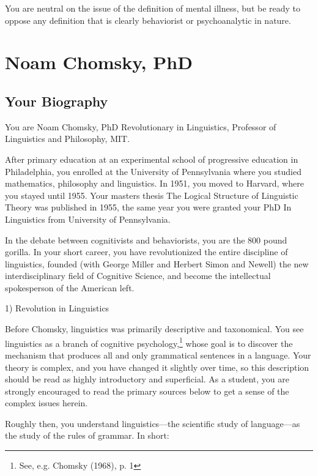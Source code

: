 \begin{refsection}
You are neutral on the issue of the definition of mental illness, but be ready to oppose any definition that is clearly behaviorist or psychoanalytic in nature.

\chapter{Noam Chomsky, PhD}
\label{noamchomskyphd}

\section{Your Biography}
\label{yourbiography}

You are Noam Chomsky, PhD Revolutionary in Linguistics, Professor of Linguistics and Philosophy, MIT.

After primary education at an experimental school of progressive education in Philadelphia, you enrolled at the University of Pennsylvania where you studied mathematics, philosophy and linguistics. In 1951, you moved to Harvard, where you stayed until 1955. Your masters thesis The Logical Structure of Linguistic Theory was published in 1955, the same year you were granted your PhD In Linguistics from University of Pennsylvania.

In the debate between cognitivists and behaviorists, you are the 800 pound gorilla. In your short career, you have revolutionized the entire discipline of linguistics, founded (with George Miller and Herbert Simon and Newell) the new interdisciplinary field of Cognitive Science, and become the intellectual spokesperson of the American left.

1) Revolution in Linguistics

Before Chomsky, linguistics was primarily descriptive and taxonomical. You see linguistics as a branch of cognitive psychology,\footnote{See, e.g. Chomsky (1968), p. 1} whose goal is to discover the mechanism that produces all and only grammatical sentences in a language. Your theory is complex, and you have changed it slightly over time, so this description should be read as highly introductory and superficial. As a student, you are strongly encouraged to read the primary sources below to get a sense of the complex issues herein.

Roughly then, you understand linguistics---the scientific study of language---as the study of the rules of grammar. In short:

\begin{quote}


\end{quote}
\end{refsection}
